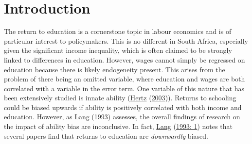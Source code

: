\documentclass[11pt,preprint, authoryear]{elsarticle}
\numberwithin{equation}{section}
\numberwithin{figure}{section}
\numberwithin{table}{section}
\begin{document}
\renewcommand{\contentsname}{Table of Contents}
{\tableofcontents}

\pagestyle{fancy}
\chead{}
\rhead{}
\lfoot{}
\lhead{}
\cfoot{}


\headsep 35pt %




\newpage

\hypertarget{introduction}{%
\section{\texorpdfstring{Introduction
\label{Introduction}}{Introduction }}\label{introduction}}

The return to education is a cornerstone topic in labour economics and
is of particular interest to policymakers. This is no different in South
Africa, especially given the significant income inequality, which is
often claimed to be strongly linked to differences in education.
However, wages cannot simply be regressed on education because there is
likely endogeneity present. This arises from the problem of there being
an omitted variable, where education and wages are both correlated with
a variable in the error term. One variable of this nature that has been
extensively studied is innate ability
(\protect\hyperlink{ref-hertz}{Hertz}
(\protect\hyperlink{ref-hertz}{2003})). Returns to schooling could be
biased upwards if ability is positively correlated with both income and
education. However, as \protect\hyperlink{ref-disc}{Lang}
(\protect\hyperlink{ref-disc}{1993}) assesses, the overall findings of
research on the impact of ability bias are inconclusive. In fact,
\protect\hyperlink{ref-disc}{Lang} (\protect\hyperlink{ref-disc}{1993:
1}) notes that several papers find that returns to education are
\emph{downwardly} biased.
\end{document}

